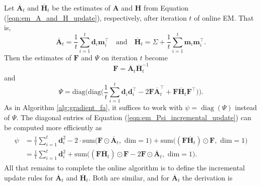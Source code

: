 \documentclass[msc,deptreport.inf]{infthesis} %
\newcommand{\matr}[1]{\mathbf{#1}}
\newcommand{\diag}{\mathop{\mathrm{diag}}}
\begin{document}
Let $\overline{\matr{A}}_t$ and $\overline{\matr{H}}_t$ be the estimates of $\matr{A}$ and $\matr{H}$ from Equation (\ref{eqn:em_A_and_H_update}), respectively, after iteration $t$ of online EM. That is,
\begin{equation}\label{eqn:em_A_and_H_incremental_update}
	\overline{\matr{A}}_t = \frac{1}{t} \sum_{i=1}^t \matr{d}_i \matr{m}_i^\intercal \quad \text{and} \quad 
	\overline{\matr{H}}_t = \Sigma + \frac{1}{t} \sum_{i=1}^t \matr{m}_i \matr{m}_i^\intercal.
\end{equation}
Then the estimates of $\matr{F}$ and $\Psi$ on iteration $t$ become
\begin{equation}
	\matr{F} = \overline{\matr{A}}_t \overline{\matr{H}}_t^{-1}
\end{equation}
and
\begin{equation}\label{eqn:em_Psi_incremental_update}
	\Psi = \text{diag}\Bigg(\text{diag}\Bigg( \frac{1}{t} \sum_{i=1}^t \matr{d}_i \matr{d}_i^\intercal - 2 \matr{F}\overline{\matr{A}}_t^\intercal + \matr{F}\overline{\matr{H}}_t \matr{F}^\intercal \Bigg)\Bigg).
\end{equation}
As in Algorithm \ref{alg:gradient_fa}, it suffices to work with $\psi = \diag(\Psi)$ instead of $\Psi$. 
The diagonal entries of Equation (\ref{eqn:em_Psi_incremental_update}) can be computed more efficiently as 
\begin{align}
\begin{split}\label{eqn:em_Psi_efficient_update}
	\psi 
	& = \frac{1}{t} \sum_{i=1}^t \matr{d}_i^2 
	- 2 \cdot \text{sum} \big(\matr{F} \odot \overline{\matr{A}}_t, \text{ dim} = 1\big)
	+ \text{sum}\big((\matr{F} \overline{\matr{H}}_t) \odot \matr{F}, \text{ dim} = 1\big) \\	
	& = \frac{1}{t} \sum_{i=1}^t \matr{d}_i^2 
	+ \text{sum} \big((\matr{F} \overline{\matr{H}}_t) \odot \matr{F} -2\matr{F} \odot \overline{\matr{A}}_t , \text{ dim} = 1\big).
\end{split}
\end{align}
All that remains to complete the online algorithm is to define the incremental update rules for $\overline{\matr{A}}_t$ and $\overline{\matr{H}}_t$. Both are similar, and for $\overline{\matr{A}}_t$ the derivation is 
\end{document}
